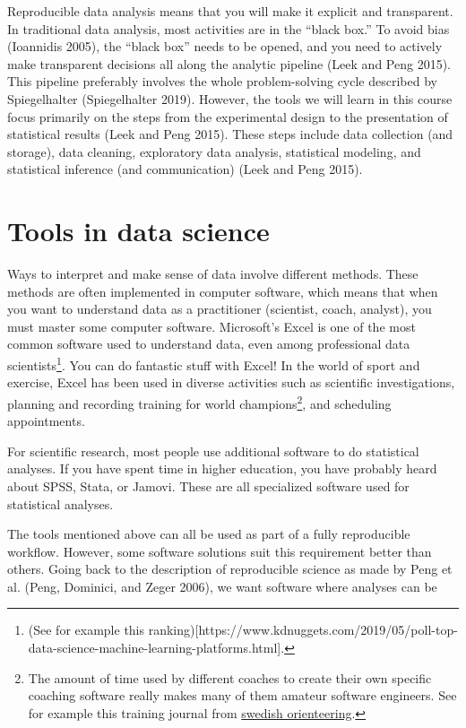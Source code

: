 \documentclass[
  11pt,
  letterpaper,
]{scrbook}
\begin{document}
Reproducible data analysis means that you will make it explicit and
transparent. In traditional data analysis, most activities are in the
``black box.'' To avoid bias (Ioannidis 2005), the ``black box'' needs
to be opened, and you need to actively make transparent decisions all
along the analytic pipeline (Leek and Peng 2015). This pipeline
preferably involves the whole problem-solving cycle described by
Spiegelhalter (Spiegelhalter 2019). However, the tools we will learn in
this course focus primarily on the steps from the experimental design to
the presentation of statistical results (Leek and Peng 2015). These
steps include data collection (and storage), data cleaning, exploratory
data analysis, statistical modeling, and statistical inference (and
communication) (Leek and Peng 2015).

\hypertarget{tools-in-data-science}{%
\section{Tools in data science}\label{tools-in-data-science}}

Ways to interpret and make sense of data involve different methods.
These methods are often implemented in computer software, which means
that when you want to understand data as a practitioner (scientist,
coach, analyst), you must master some computer software. Microsoft's
Excel is one of the most common software used to understand data, even
among professional data scientists\footnote{(See for example this
  ranking){[}https://www.kdnuggets.com/2019/05/poll-top-data-science-machine-learning-platforms.html{]}.}.
You can do fantastic stuff with Excel! In the world of sport and
exercise, Excel has been used in diverse activities such as scientific
investigations, planning and recording training for world
champions\footnote{The amount of time used by different coaches to
  create their own specific coaching software really makes many of them
  amateur software engineers. See for example this training journal from
  \href{http://obasen.orientering.se/traningsdagbok/installationshandledning.htm}{swedish
  orienteering}.}, and scheduling appointments.

For scientific research, most people use additional software to do
statistical analyses. If you have spent time in higher education, you
have probably heard about SPSS, Stata, or Jamovi. These are all
specialized software used for statistical analyses.

The tools mentioned above can all be used as part of a fully
reproducible workflow. However, some software solutions suit this
requirement better than others. Going back to the description of
reproducible science as made by Peng et al. (Peng, Dominici, and Zeger
2006), we want software where analyses can be
\end{document}
